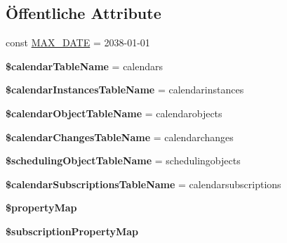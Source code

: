 \subsection*{Öffentliche Attribute}
\begin{DoxyCompactItemize}
\item 
const \mbox{\hyperlink{class_sabre_1_1_cal_d_a_v_1_1_backend_1_1_p_d_o_a9584fadbc3fb81ae777b5bcffaf03365}{M\+A\+X\+\_\+\+D\+A\+TE}} = \textquotesingle{}2038-\/01-\/01\textquotesingle{}
\item 
\mbox{\label{class_sabre_1_1_cal_d_a_v_1_1_backend_1_1_p_d_o_a396f0985dadef2ad35c141fc5157a1f8}} 
{\bfseries \$calendar\+Table\+Name} = \textquotesingle{}calendars\textquotesingle{}
\item 
\mbox{\label{class_sabre_1_1_cal_d_a_v_1_1_backend_1_1_p_d_o_a8b69d8b09f7e98a6b25b16478dd17fc9}} 
{\bfseries \$calendar\+Instances\+Table\+Name} = \textquotesingle{}calendarinstances\textquotesingle{}
\item 
\mbox{\label{class_sabre_1_1_cal_d_a_v_1_1_backend_1_1_p_d_o_ad7e4a08a268d3b882970499057ef0908}} 
{\bfseries \$calendar\+Object\+Table\+Name} = \textquotesingle{}calendarobjects\textquotesingle{}
\item 
\mbox{\label{class_sabre_1_1_cal_d_a_v_1_1_backend_1_1_p_d_o_a4f68e85c6bbeea6045019b800845a11d}} 
{\bfseries \$calendar\+Changes\+Table\+Name} = \textquotesingle{}calendarchanges\textquotesingle{}
\item 
\mbox{\label{class_sabre_1_1_cal_d_a_v_1_1_backend_1_1_p_d_o_a8fb5949eebeb1bddcaeef2ec70ccd861}} 
{\bfseries \$scheduling\+Object\+Table\+Name} = \textquotesingle{}schedulingobjects\textquotesingle{}
\item 
\mbox{\label{class_sabre_1_1_cal_d_a_v_1_1_backend_1_1_p_d_o_a0eb7d7f2a42128cf4bfaf02d37d8c499}} 
{\bfseries \$calendar\+Subscriptions\+Table\+Name} = \textquotesingle{}calendarsubscriptions\textquotesingle{}
\item 
{\bfseries \$property\+Map}
\item 
{\bfseries \$subscription\+Property\+Map}
\end{DoxyCompactItemize}
